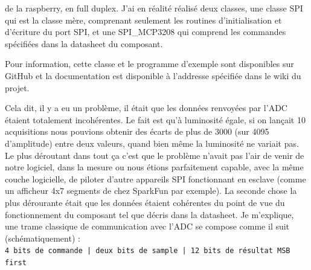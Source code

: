{		de la raspberry, en full duplex. J'ai en réalité réalisé deux classes, une classe
		SPI qui est la classe mère, comprenant seulement les routines d'initialisation et d'écriture
		du port SPI, et une SPI\_MCP3208 qui comprend les commandes spécifiées dans la datasheet
		du composant.
		\par
		Pour information, cette classe et le programme d'exemple sont disponibles sur GitHub et la
		documentation est disponible à l'addresse spécifiée dans le wiki du projet.
		\par
		Cela dit, il y a eu un problème, il était que les données renvoyées par l'ADC étaient
		totalement incohérentes. Le fait est qu'à luminosité égale, si on lançait 10 acquisitions
		nous pouvions obtenir des écarts de plus de 3000 (sur 4095 d'amplitude) entre
		deux valeurs, quand bien même la luminosité ne variait pas. Le plus déroutant
		dans tout ça c'est que le problème n'avait pas l'air de venir de notre logiciel,
		dans la mesure ou nous étions parfaitement capable, avec la même couche logicielle,
		de piloter d'autre appareils SPI fonctionnant en esclave (comme un afficheur 4x7
		segments de chez SparkFun par exemple). La seconde chose la plus dérourante était
		que les données étaient cohérentes du point de vue du fonctionnement du composant
		tel que décris dans la datasheet. Je m'explique, une trame classique de communication avec
		l'ADC se compose comme il suit (schématiquement) :
		\\
		\texttt{4 bits de commande | deux bits de sample | 12 bits de résultat MSB first}\\

}
